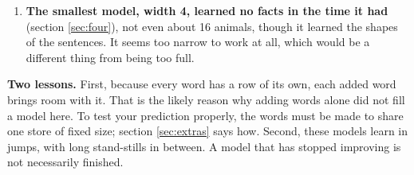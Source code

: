 \begin{keybox}
\begin{enumerate}[itemsep=1pt,topsep=2pt]
      that our test for the end of a run called them finished. I replayed one of them exactly
      and let it run four times as long: it stood at 37 for most of that time and then rose
      to 98.6. The other I started again from the same numbers on the same text, with the
      computer set up slightly differently, which changes only the last digits of its
      arithmetic. It never paused at 37 and reached 100. Whether a run got stuck was chance.
\item \textbf{The smallest model, width 4, learned no facts in the time it had} (section
      \ref{sec:four}), not even about 16 animals, though it learned the shapes of the
      sentences. It seems too narrow to work at all, which would be a different thing from
      being too full.
\end{enumerate}

\textbf{Two lessons.} First, because every word has a row of its own, each added word brings
room with it. That is the likely reason why adding words alone did not fill a model here. To
test your prediction properly, the words must be made to share one store of fixed size;
section \ref{sec:extras} says how. Second, these models learn in jumps, with long stand-stills
in between. A model that has stopped improving is not necessarily finished.
\end{keybox}
